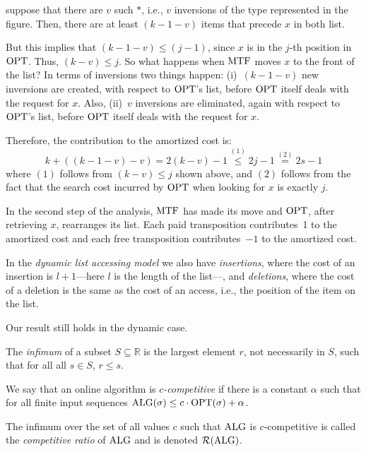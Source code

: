 \begin{frame}
suppose that there are $v$ such $\ast$,
i.e., $v$ inversions of the type represented in the figure.  Then,
there are at least $(k-1-v)$ items that precede $x$ in both list.

But this implies that $(k-1-v)\le (j-1)$, since $x$ is in the $j$-th
position in $\mathrm{OPT}$.  Thus, 
$(k-v)\le j$.
So what happens when $\mathrm{MTF}$ moves $x$ to the front of the list?  In
terms of inversions two things happen: (i)~$(k-1-v)$ new inversions
are created, with respect to $\mathrm{OPT}$'s list, before $\mathrm{OPT}$ itself deals
with the request for $x$.  Also, (ii)~$v$ inversions are eliminated,
again with respect to $\mathrm{OPT}$'s list, before $\mathrm{OPT}$ itself deals with
the request for $x$.
\end{frame}

\begin{frame}
Therefore, the contribution to the amortized cost is:
$$
k+((k-1-v)-v)=2(k-v)-1
\stackrel{(1)}{\le} 2j-1
\stackrel{(2)}{=} 2s-1
$$
where $(1)$ follows from $(k-v)\le j$ shown above, and $(2)$ follows from the
fact that the search cost incurred by $\mathrm{OPT}$ when looking for $x$ is
exactly $j$. 

In the second step of the analysis, $\mathrm{MTF}$ has made its move and
$\mathrm{OPT}$, after retrieving $x$, rearranges its list.
Each paid transposition
contributes~1 to the amortized cost and each free
transposition contributes~$-1$ to the amortized cost.
\end{frame}

\begin{frame}
In the {\em dynamic list accessing model}
we also have {\em insertions}, where the cost of an insertion
is $l+1$---here $l$ is the length of the list---, and {\em deletions},
where the cost of a deletion is the same as the cost of an access,
i.e., the position of the item on the list.  

Our result still holds in the dynamic case.
\end{frame}

\begin{frame}
The {\em infimum} of a subset $S\subseteq\mathbb{R}$ is
the largest element $r$, not necessarily in $S$, such that for all all
$s\in S$, $r\le s$.

We say that an online algorithm is 
{\em $c$-competitive} if there is a
constant $\alpha$ such that for all finite input sequences
$\mathrm{ALG}(\sigma)\le c\cdot\mathrm{OPT}(\sigma)+\alpha$.  

The infimum over the set
of all values $c$ such that $\mathrm{ALG}$ is $c$-competitive is called the
{\em competitive ratio} of $\mathrm{ALG}$ and is
denoted $\mathcal{R}(\mathrm{ALG})$.
\end{frame}

